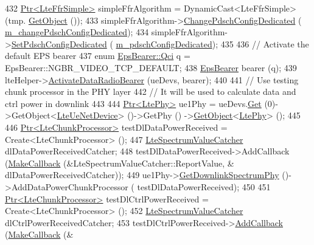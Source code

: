 \begin{DoxyCode}
432   \hyperlink{classns3_1_1Ptr}{Ptr<LteFfrSimple>} simpleFfrAlgorithm = DynamicCast<LteFfrSimple>(tmp.
      \hyperlink{classns3_1_1PointerValue_a53d0f9f5c538ea6120c96a1ecb1344a8}{GetObject} ());
433   simpleFfrAlgorithm->\hyperlink{classns3_1_1LteFfrSimple_a23f83819e8f2262243592a111f8668fe}{ChangePdschConfigDedicated} (
      \hyperlink{classLteDownlinkPowerControlTestCase_ad637612640933b4257b61f515ae44186}{m\_changePdschConfigDedicated});
434   simpleFfrAlgorithm->\hyperlink{classns3_1_1LteFfrSimple_a3da8348dd3cc4173464933912ae7524b}{SetPdschConfigDedicated} (
      \hyperlink{classLteDownlinkPowerControlTestCase_a585b94172221a43077e191eb81bf72e2}{m\_pdschConfigDedicated});
435 
436   \textcolor{comment}{// Activate the default EPS bearer}
437   \textcolor{keyword}{enum} \hyperlink{structns3_1_1EpsBearer_aecf0c67109c5eb4ec0b07226fff5885e}{EpsBearer::Qci} q = EpsBearer::NGBR\_VIDEO\_TCP\_DEFAULT;
438   \hyperlink{structns3_1_1EpsBearer}{EpsBearer} bearer (q);
439   lteHelper->\hyperlink{classns3_1_1LteHelper_ac896e16cf162e4beeaa292d39ab1b700}{ActivateDataRadioBearer} (ueDevs, bearer);
440 
441   \textcolor{comment}{// Use testing chunk processor in the PHY layer}
442   \textcolor{comment}{// It will be used to calculate data and ctrl power in downlink}
443 
444   \hyperlink{classns3_1_1Ptr}{Ptr<LtePhy>} ue1Phy = ueDevs.\hyperlink{classns3_1_1NetDeviceContainer_a677d62594b5c9d2dea155cc5045f4d0b}{Get} (0)->GetObject<\hyperlink{classns3_1_1LteUeNetDevice}{LteUeNetDevice}> ()->GetPhy ()
      ->\hyperlink{classns3_1_1Object_a13e18c00017096c8381eb651d5bd0783}{GetObject}<\hyperlink{classns3_1_1LtePhy}{LtePhy}> ();
445 
446   \hyperlink{classns3_1_1Ptr}{Ptr<LteChunkProcessor>} testDlDataPowerReceived = Create<LteChunkProcessor> ();
447   \hyperlink{classns3_1_1LteSpectrumValueCatcher}{LteSpectrumValueCatcher} dlDataPowerReceivedCatcher;
448   testDlDataPowerReceived->AddCallback (\hyperlink{group__makecallbackmemptr_ga9376283685aa99d204048d6a4b7610a4}{MakeCallback} (&LteSpectrumValueCatcher::ReportValue, &
      dlDataPowerReceivedCatcher));
449   ue1Phy->\hyperlink{classns3_1_1LtePhy_a9560f8862545c7c5760e7f6737c5b938}{GetDownlinkSpectrumPhy} ()->AddDataPowerChunkProcessor (
      testDlDataPowerReceived);
450 
451   \hyperlink{classns3_1_1Ptr}{Ptr<LteChunkProcessor>} testDlCtrlPowerReceived = Create<LteChunkProcessor> ();
452   \hyperlink{classns3_1_1LteSpectrumValueCatcher}{LteSpectrumValueCatcher} dlCtrlPowerReceivedCatcher;
453   testDlCtrlPowerReceived->\hyperlink{classns3_1_1LteChunkProcessor_a122d4a00d72e68a0a8b2cbdd165cdfd8}{AddCallback} (\hyperlink{group__makecallbackmemptr_ga9376283685aa99d204048d6a4b7610a4}{MakeCallback} (&

\end{DoxyCode}
